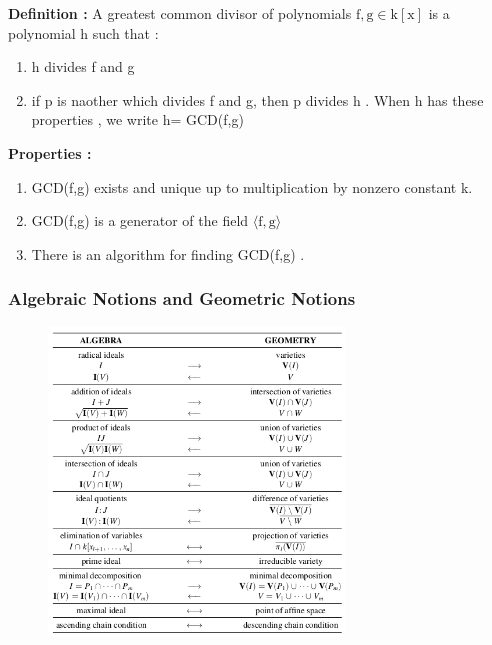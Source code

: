 \documentclass[11pt]{article}
\begin{document}
\textbf{Definition :}\newline
A greatest common divisor of polynomials $\mathrm{ f,g \in k[x]}$ is a polynomial h such that :
\begin{enumerate}
\item h divides f and g
\item if p is naother which divides f and g, then p divides h . When h has these properties , we write h= GCD(f,g)
\end{enumerate}

\textbf{Properties :}\newline
\begin{enumerate}
\item GCD(f,g) exists and unique up to multiplication by nonzero constant k.
\item GCD(f,g) is a generator of the field $\mathrm{\langle f,g \rangle}$
\item There is an algorithm for finding GCD(f,g) .
\end{enumerate}





\subsubsection{Algebraic Notions and Geometric Notions}
\begin{figure}[H]
  \begin{center}
    \includegraphics[width=0.7\textwidth]{algebra_geometry.png}
    \caption{}
    \label{fig: }
  \end{center}
\end{figure}
\end{document}
